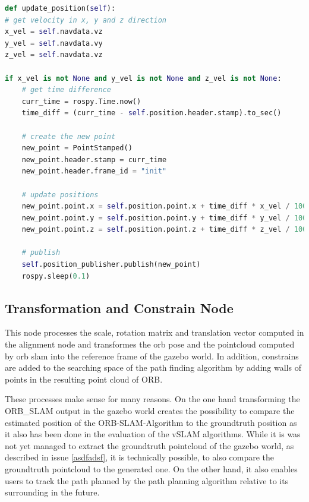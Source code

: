 	\begin{lstlisting}[language=python, caption=Main part of the position estimation node, label=lst:posupdate]
	def update_position(self):
# get velocity in x, y and z direction
x_vel = self.navdata.vz
y_vel = self.navdata.vy
z_vel = self.navdata.vz

if x_vel is not None and y_vel is not None and z_vel is not None:
	# get time difference
	curr_time = rospy.Time.now()
	time_diff = (curr_time - self.position.header.stamp).to_sec()
	
	# create the new point
	new_point = PointStamped()
	new_point.header.stamp = curr_time
	new_point.header.frame_id = "init"
	
	# update positions
	new_point.point.x = self.position.point.x + time_diff * x_vel / 1000
	new_point.point.y = self.position.point.y + time_diff * y_vel / 1000
	new_point.point.z = self.position.point.z + time_diff * z_vel / 1000
	
	# publish
	self.position_publisher.publish(new_point)
	rospy.sleep(0.1)
	\end{lstlisting}
	
	
	\subsection{Transformation and Constrain Node}
	
	This node processes the scale, rotation matrix and translation vector computed in the alignment node and transformes the orb pose and the pointcloud computed 
	by orb slam into the reference frame of the gazebo world. In addition, constrains are added to the searching space of the path finding algorithm by adding 
	walls of points in the resulting point cloud of ORB. 
	
	These processes make sense for many reasons. On the one hand transforming the ORB\_SLAM output in the gazebo world creates the possibility to compare the 
	estimated position of the ORB-SLAM-Algorithm to the groundtruth position as it also has been done in the evaluation of the vSLAM algorithms. While it is 
	was not yet managed to extract the groundtruth pointcloud of the gazebo world, as described in issue \ref{asdfadsf}, it is technically possible, to also 
	compare the groundtruth pointcloud to the generated one. On the other hand, it also enables users to track the path planned by the path planning algorithm relative
	to its surrounding in the future. 
	
